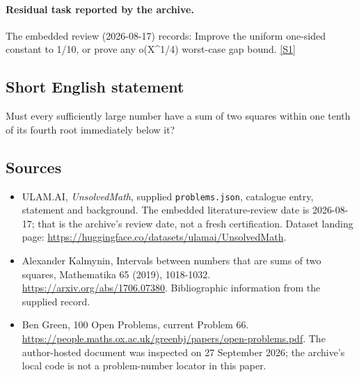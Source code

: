 \documentclass[11pt,a4paper]{article}
\newcommand{\sref}[2]{\hyperlink{source:#1:#2}{[S#2]}}
\begin{document}
\paragraph{Residual task reported by the archive.}

The embedded review (2026-08-17) records: Improve the uniform one-sided constant to 1/10, or prove any o(X\textasciicircum{}{1/4}) worst-case gap bound. \sref{statement}{1}

\subsection{Short English statement}

Must every sufficiently large number have a sum of two squares within one tenth of its fourth root immediately below it?

\subsection{Sources}

{\small

\begin{itemize}

\item[\hypertarget{source:statement:1}{S1}] ULAM.AI, \emph{UnsolvedMath}, supplied \texttt{problems.json}, catalogue entry, statement and background. The embedded literature-review date is 2026-08-17; that is the archive’s review date, not a fresh certification. Dataset landing page: \url{https://huggingface.co/datasets/ulamai/UnsolvedMath}.

\item[\hypertarget{source:statement:2}{S2}] Alexander Kalmynin, Intervals between numbers that are sums of two squares, Mathematika 65 (2019), 1018-1032. \url{https://arxiv.org/abs/1706.07380}. Bibliographic information from the supplied record.

\item[\hypertarget{source:statement:3}{S3}] Ben Green, 100 Open Problems, current Problem 66. \url{https://people.maths.ox.ac.uk/greenbj/papers/open-problems.pdf}. The author-hosted document was inspected on 27 September 2026; the archive’s local code is not a problem-number locator in this paper.

\end{itemize}

}

\label{end:statement}
\end{document}
